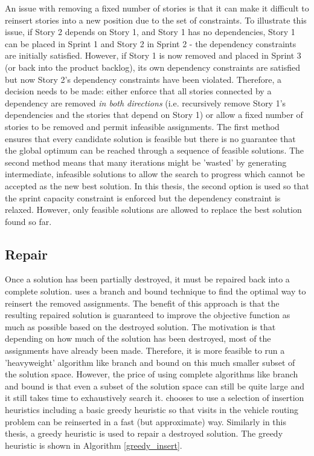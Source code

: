 An issue with removing a fixed number of stories is that it can make it difficult to reinsert stories into a new position due to the set of constraints. To illustrate this issue, if Story 2 depends on Story 1, and Story 1 has no dependencies, Story 1 can be placed in Sprint 1 and Story 2 in Sprint 2 - the dependency constraints are initially satisfied. However, if Story 1 is now removed and placed in Sprint 3 (or back into the product backlog), its own dependency constraints are satisfied but now Story 2's dependency constraints have been violated. Therefore, a decision needs to be made: either enforce that all stories connected by a dependency are removed \emph{in both directions} (i.e. recursively remove Story 1's dependencies and the stories that depend on Story 1) or allow a fixed number of stories to be removed and permit infeasible assignments. The first method ensures that every candidate solution is feasible but there is no guarantee that the global optimum can be reached through a sequence of feasible solutions. The second method means that many iterations might be 'wasted' by generating intermediate, infeasible solutions to allow the search to progress which cannot be accepted as the new best solution. In this thesis, the second option is used so that the sprint capacity constraint is enforced but the dependency constraint is relaxed. However, only feasible solutions are allowed to replace the best solution found so far.

\subsection{Repair} \label{repair}

Once a solution has been partially destroyed, it must be repaired back into a complete solution. \citet{shaw1998using} uses a branch and bound technique to find the optimal way to reinsert the removed assignments. The benefit of this approach is that the resulting repaired solution is guaranteed to improve the objective function as much as possible based on the destroyed solution. The motivation is that depending on how much of the solution has been destroyed, most of the assignments have already been made. Therefore, it is more feasible to run a 'heavyweight' algorithm like branch and bound on this much smaller subset of the solution space. However, the price of using complete algorithms like branch and bound is that even a subset of the solution space can still be quite large and it still takes time to exhaustively search it. \citet{ropke2006adaptive} chooses to use a selection of insertion heuristics including a basic greedy heuristic so that visits in the vehicle routing problem can be reinserted in a fast (but approximate) way. Similarly in this thesis, a greedy heuristic is used to repair a destroyed solution. The greedy heuristic is shown in Algorithm \ref{greedy_insert}.

